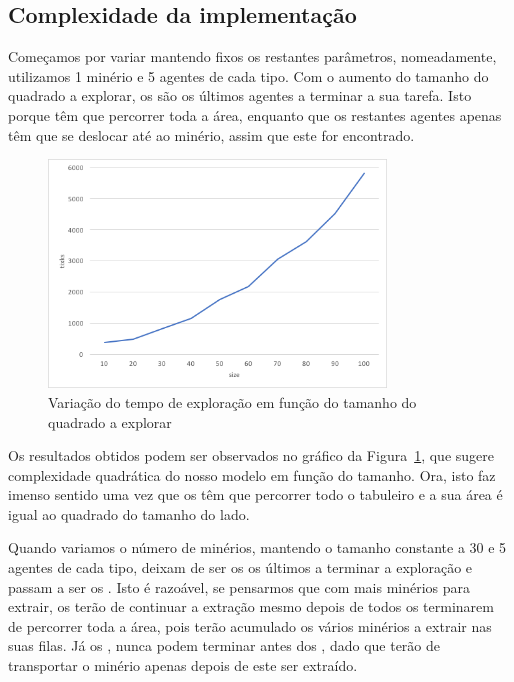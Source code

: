 \documentclass[12pt]{report}
\begin{document}
\subsection{Complexidade da implementação}

Começamos por variar \size mantendo fixos os restantes parâmetros, nomeadamente, utilizamos 1 minério e 5 agentes de cada tipo. Com o aumento do tamanho do quadrado a explorar, os \spotters são os últimos agentes a terminar a sua tarefa. Isto porque têm que percorrer toda a área, enquanto que os restantes agentes apenas têm que se deslocar até ao minério, assim que este for encontrado. 

\begin{figure}[h]
	\centering
    \includegraphics[width=0.8\textwidth]{ticks-size}
	\caption{Variação do tempo de exploração em função do tamanho do quadrado a explorar}
	\label{ticks-size}
\end{figure}

Os resultados obtidos podem ser observados no gráfico da Figura~\ref{ticks-size}, que sugere complexidade quadrática do nosso modelo em função do tamanho. Ora, isto faz imenso sentido uma vez que os \spotters têm que percorrer todo o tabuleiro e a sua área é igual ao quadrado do tamanho do lado.

Quando variamos o número de minérios, mantendo o tamanho constante a 30 e 5 agentes de cada tipo, deixam de ser os \spotters os últimos a terminar a exploração e passam a ser os \transporters. Isto é razoável, se pensarmos que com mais minérios para extrair, os \producers terão de continuar a extração mesmo depois de todos os \spotters terminarem de percorrer toda a área, pois terão acumulado os vários minérios a extrair nas suas filas. Já os \transporters, nunca podem terminar antes dos \producers, dado que terão de transportar o minério apenas depois de este ser extraído.
\end{document}
